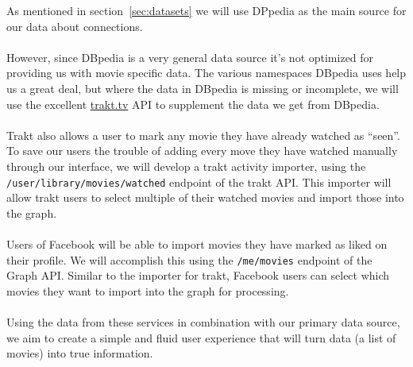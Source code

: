 As mentioned in section~\ref{sec:datasets} we will use DPpedia as the main source
for our data about connections.

\paragraph{}
However, since DBpedia is a very general data source it's not optimized
for providing us with movie specific data.
The various namespaces DBpedia uses help us a great deal,
but where the data in DBpedia is missing or incomplete,
we will use the excellent \href{http://trakt.tv/}{trakt.tv} API
to supplement the data we get from DBpedia.

\paragraph{}
Trakt also allows a user to mark any movie they have
already watched as ``seen''.
To save our users the trouble of adding every move they
have watched manually through our interface, we will
develop a trakt activity importer, using the
\texttt{/user/library/movies/watched} endpoint of the
trakt API.
This importer will allow trakt users to select multiple
of their watched movies and import those into the graph.

\paragraph{}
Users of Facebook will be able to import movies they
have marked as liked on their profile.
We will accomplish this using the \texttt{/me/movies}
endpoint of the Graph API.
Similar to the importer for trakt, Facebook users can
select which movies they want to import into the graph
for processing.

\paragraph{}
Using the data from these services in combination with
our primary data source, we aim to create a simple
and fluid user experience that will turn data (a list
of movies) into true information.
